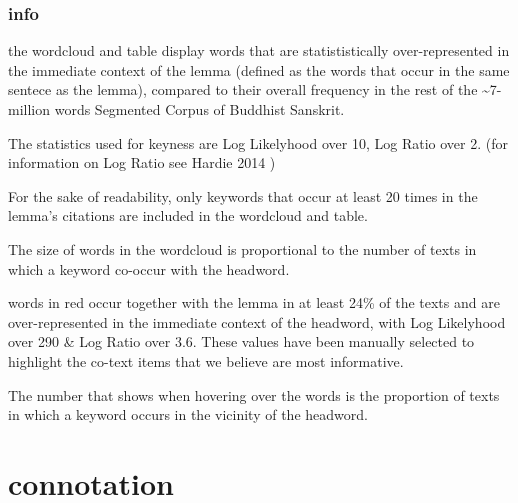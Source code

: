\documentclass[
  letterpaper,
  DIV=11,
  numbers=noendperiod,
  oneside]{scrreprt}
\begin{document}

\hypertarget{info-4}{%
\subsubsection{info}\label{info-4}}

the wordcloud and table display words that are statististically
over-represented in the immediate context of the lemma (defined as the
words that occur in the same sentece as the lemma), compared to their
overall frequency in the rest of the \textasciitilde7-million words
Segmented Corpus of Buddhist Sanskrit.

The statistics used for keyness are Log Likelyhood over 10, Log Ratio
over 2. (for information on Log Ratio see Hardie 2014 )

For the sake of readability, only keywords that occur at least 20 times
in the lemma's citations are included in the wordcloud and table.

The size of words in the wordcloud is proportional to the number of
texts in which a keyword co-occur with the headword.

words in red occur together with the lemma in at least 24\% of the texts
and are over-represented in the immediate context of the headword, with
Log Likelyhood over 290 \& Log Ratio over 3.6. These values have been
manually selected to highlight the co-text items that we believe are
most informative.

The number that shows when hovering over the words is the proportion of
texts in which a keyword occurs in the vicinity of the headword.

\hypertarget{sec-connotation}{%
\section{connotation}\label{sec-connotation}}
\end{document}
